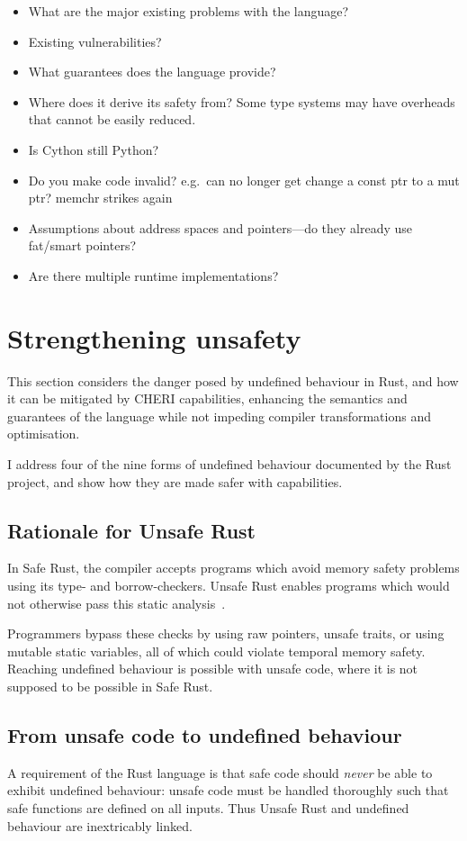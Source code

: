 \documentclass[dissertation.tex]{subfiles}
\begin{document}
\begin{itemize}
    \item What are the major existing problems with the language?
    \item Existing vulnerabilities?
    \item What guarantees does the language provide?
    \item Where does it derive its safety from? Some type systems may
    have overheads that cannot be easily reduced.
    \item Is Cython still Python?
    \item Do you make code invalid? e.g.\ can no longer get change a
    const ptr to a mut ptr? memchr strikes again
    \item Assumptions about address spaces and pointers---do they
    already use fat/smart pointers?
    \item Are there multiple runtime implementations?
\end{itemize}


\section{Strengthening unsafety}
\label{sec:eval-betterunsafe}

This section considers the danger posed by undefined behaviour in Rust,
and how it can be mitigated by CHERI capabilities, enhancing the
semantics and guarantees of the language while not impeding compiler
transformations and optimisation.

I address four of the nine forms of undefined behaviour documented by
the Rust project, and show how they are made safer with capabilities.

\subsection{Rationale for Unsafe Rust}
In Safe Rust, the compiler accepts programs which avoid memory safety
problems using its type- and borrow-checkers.
Unsafe Rust enables programs which would not otherwise pass this static
analysis~\cite{rust-trpl-book}.

Programmers bypass these checks by using raw pointers, unsafe traits, or
using mutable static variables, all of which could violate temporal
memory safety.
Reaching undefined behaviour is possible with unsafe code, where it is
not supposed to be possible in Safe Rust.


\subsection{From unsafe code to undefined behaviour}
A requirement of the Rust language is that safe code should \emph{never}
be able to exhibit undefined behaviour: unsafe code must be handled
thoroughly such that safe functions are defined on all inputs.
Thus Unsafe Rust and undefined behaviour are inextricably linked.
\end{document}
